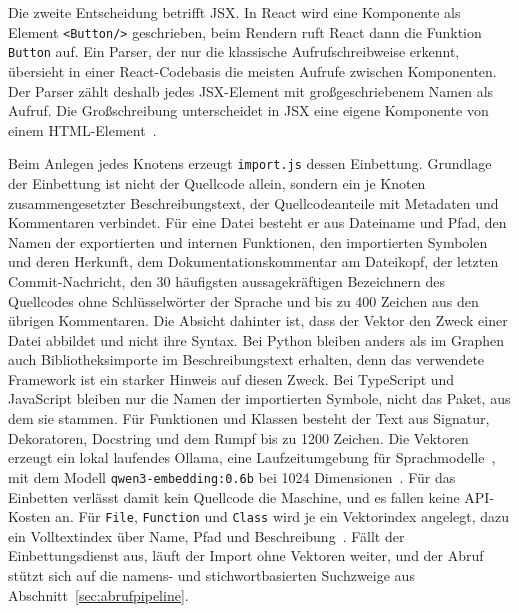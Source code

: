 Die zweite Entscheidung betrifft JSX. In React wird eine Komponente als Element \texttt{<Button/>} geschrieben, beim Rendern ruft React dann die Funktion \texttt{Button} auf. Ein Parser, der nur die klassische Aufrufschreibweise erkennt, übersieht in einer React-Codebasis die meisten Aufrufe zwischen Komponenten. Der Parser zählt deshalb jedes JSX-Element mit großgeschriebenem Namen als Aufruf. Die Großschreibung unterscheidet in JSX eine eigene Komponente von einem HTML-Element~\parencite{reactdocs}.

Beim Anlegen jedes Knotens erzeugt \texttt{import.js} dessen Einbettung. Grundlage der Einbettung ist nicht der Quellcode allein, sondern ein je Knoten zusammengesetzter Beschreibungstext, der Quellcodeanteile mit Metadaten und Kommentaren verbindet. Für eine Datei besteht er aus Dateiname und Pfad, den Namen der exportierten und internen Funktionen, den importierten Symbolen und deren Herkunft, dem Dokumentationskommentar am Dateikopf, der letzten Commit-Nachricht, den 30 häufigsten aussagekräftigen Bezeichnern des Quellcodes ohne Schlüsselwörter der Sprache und bis zu 400 Zeichen aus den übrigen Kommentaren. Die Absicht dahinter ist, dass der Vektor den Zweck einer Datei abbildet und nicht ihre Syntax. Bei Python bleiben anders als im Graphen auch Bibliotheksimporte im Beschreibungstext erhalten, denn das verwendete Framework ist ein starker Hinweis auf diesen Zweck. Bei TypeScript und JavaScript bleiben nur die Namen der importierten Symbole, nicht das Paket, aus dem sie stammen. Für Funktionen und Klassen besteht der Text aus Signatur, Dekoratoren, Docstring und dem Rumpf bis zu 1200 Zeichen. Die Vektoren erzeugt ein lokal laufendes Ollama, eine Laufzeitumgebung für Sprachmodelle~\parencite{ollama}, mit dem Modell \texttt{qwen3-embedding:0.6b} bei 1024 Dimensionen~\parencite{zhang2025qwen3embedding}. Für das Einbetten verlässt damit kein Quellcode die Maschine, und es fallen keine API-Kosten an. Für \texttt{File}, \texttt{Function} und \texttt{Class} wird je ein Vektorindex angelegt, dazu ein Volltextindex über Name, Pfad und Beschreibung~\parencite{neo4jvector,neo4jfulltext}. Fällt der Einbettungsdienst aus, läuft der Import ohne Vektoren weiter, und der Abruf stützt sich auf die namens- und stichwortbasierten Suchzweige aus Abschnitt~\ref{sec:abrufpipeline}.

